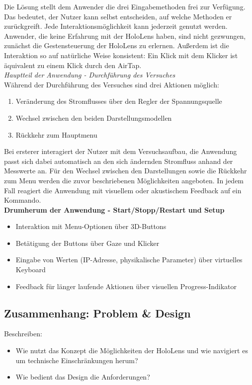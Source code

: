 Die Lösung stellt dem Anwender die drei Eingabemethoden frei zur Verfügung. Das bedeutet, der Nutzer kann selbst entscheiden, auf welche Methoden er zurückgreift. Jede Interaktionsmöglichkeit kann jederzeit genutzt werden. Anwender, die keine Erfahrung mit der HoloLens haben, sind nicht gezwungen, zunächst die Gestensteuerung der HoloLens zu erlernen. Außerdem ist die Interaktion so auf natürliche Weise konsistent: Ein Klick mit dem Klicker ist äquivalent zu einem Klick durch den AirTap.\\

\textit{Hauptteil der Anwendung - Durchführung des Versuches}\\
Während der Durchführung des Versuches sind drei Aktionen möglich:
\begin{enumerate}[topsep=-2px]
	\setlength{\itemsep}{-5pt}
	\item Veränderung des Stromflusses über den Regler der Spannungsquelle
	\item Wechsel zwischen den beiden Darstellungsmodellen
	\item Rückkehr zum Hauptmenu
\end{enumerate}
\vspace{4px}

Bei ersterer interagiert der Nutzer mit dem Versuchsaufbau, die Anwendung passt sich dabei automatisch an den sich ändernden Stromfluss anhand der Messwerte an. Für den Wechsel zwischen den Darstellungen sowie die Rückkehr zum Menu werden die zuvor beschriebenen Möglichkeiten angeboten. In jedem Fall reagiert die Anwendung mit visuellem oder akustischem Feedback auf ein Kommando.\\

\textbf{Drumherum der Anwendung - Start/Stopp/Restart und Setup}
\begin{itemize}[topsep=-2px]
	\setlength{\itemsep}{-5pt}
	\item Interaktion mit Menu-Optionen über 3D-Buttons
	\item Betätigung der Buttons über Gaze und Klicker
	\item Eingabe von Werten (IP-Adresse, physikalische Parameter) über virtuelles Keyboard
	\item Feedback für länger laufende Aktionen über visuellen Progress-Indikator
\end{itemize}


\subsection{Zusammenhang: Problem \& Design}
Beschreiben: 
\begin{itemize}
	\item Wie nutzt das Konzept die Möglichkeiten der HoloLens und wie navigiert es um technische Einschränkungen herum?
	\item Wie bedient das Design die Anforderungen?
\end{itemize}

